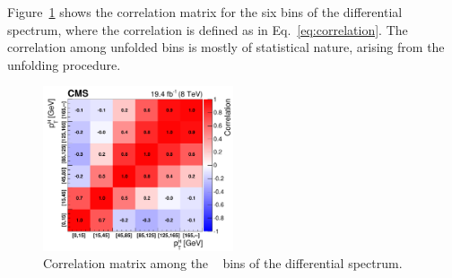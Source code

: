 Figure~\ref{fig:cov_matrix} shows the correlation matrix for the six bins of the differential spectrum, where the correlation is defined as in Eq.~\eqref{eq:correlation}. The correlation among unfolded bins is mostly of statistical nature, arising from the unfolding procedure.

\begin{figure}[!htb]
\centering
\includegraphics[width=0.5\textwidth]{images/unblinding/covMatrix.pdf}
\caption{Correlation matrix among the \pth~ bins of the differential spectrum.}\label{fig:cov_matrix}
\end{figure}

